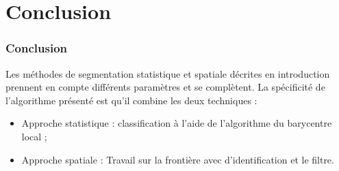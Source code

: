 \documentclass[handout]{beamer}
\begin{document}
	\section{Conclusion}

		\begin{frame}
			\frametitle{Conclusion}
			Les méthodes de segmentation statistique et spatiale décrites en introduction prennent en compte différents paramètres et se complètent. La spécificité de l'algorithme présenté est qu'il combine les deux techniques :
			\begin{itemize}
				\item Approche statistique : classification à l'aide de l’algorithme du barycentre local ;
				\item Approche spatiale : Travail sur la frontière avec d'identification et le filtre.
			\end{itemize}
		\end{frame}
\end{document}
